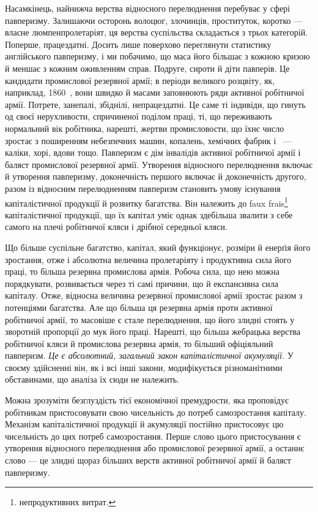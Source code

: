 
Насамкінець, найнижча верства відносного перелюднення
перебуває у сфері павперизму. Залишаючи осторонь волоцюг,
злочинців, проституток, коротко — власне люмпенпролетаріят,
ця верства суспільства складається з трьох категорій. Поперше,
працездатні. Досить лише поверхово переглянути статистику
англійського павперизму, і ми побачимо, що маса його більшає
з кожною кризою й меншає з кожним оживленням справ. Подруге,
сироти й діти павперів. Це кандидати промислової резервної
армії; в періоди великого розцвіту, як, наприклад, 1860~, вони
швидко й масами заповнюють ряди активної робітничої армії.
Потрете, занепалі, збіднілі, непрацездатні. Це саме ті індивіди,
що гинуть од своєї нерухливости, спричиненої поділом праці,
ті, що переживають нормальний вік робітника, нарешті, жертви
промисловости, що їхнє число зростає з поширенням небезпечних
машин, копалень, хемічних фабрик і~ — каліки, хорі,
вдови тощо. Павперизм є дім інвалідів активної робітничої армії
і баляст промислової резервної армії. Утворення відносного
перелюднення включає й утворення павперизму, доконечність
першого включає й доконечність другого, разом із відносним
перелюдненням павперизм становить умову існування капіталістичної
продукції й розвитку багатства. Він належить до faux
frais\footnote*{
непродуктивних витрат. 
} капіталістичної продукції, що їх капітал уміє однак здебільша
звалити з себе самого на плечі робітничої кляси і дрібної
середньої кляси.

Що більше суспільне багатство, капітал, який функціонує,
розміри й енерґія його зростання, отже і абсолютна величина пролетаріяту
і продуктивна сила його праці, то більша резервна промислова
армія. Робоча сила, що нею можна порядкувати, розвивається
через ті самі причини, що й експансивна сила капіталу.
Отже, відносна величина резервної промислової армії зростає
разом з потенціями багатства. Але що більша ця резервна армія
проти активної робітничої армії, то масовіше є стале перелюднення,
що його злидні стоять у зворотній пропорції до мук його
праці. Нарешті, що більша жебрацька верства робітничої кляси
й промислова резервна армія, то більший офіціяльний павперизм.
\emph{Це є абсолютний, загальний закон капіталістичної акумуляції.}
У своєму здійсненні він, як і всі інші закони, модифікується
різноманітними обставинами, що аналіза їх сюди не
належить.

Можна зрозуміти безглуздість тієї економічної премудрости,
яка проповідує робітникам пристосовувати свою чисельність до
потреб самозростання капіталу. Механізм капіталістичної продукції
й акумуляції постійно пристосовує цю чисельність до цих
потреб самозростання. Перше слово цього пристосування є утворення
відносного перелюднення або промислової резервної армії,
а останнє слово — це злидні щораз більших верств активної
робітничої армії й баляст павперизму.

